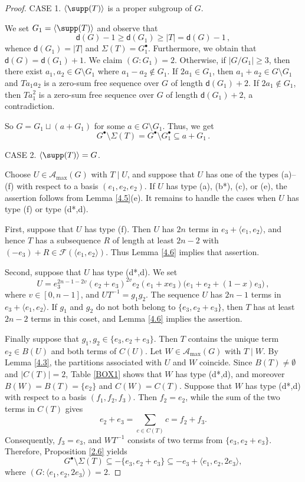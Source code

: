 \documentclass[a4paper, 10pt]{amsart}
\theoremstyle{plain}
\theoremstyle{definition}
\numberwithin{equation}{section}
\begin{document}
{\begin{proof}
\smallskip
\noindent
CASE 1. $\langle \supp (T) \rangle$ is a proper subgroup of $G$.

We set $G_1 = \langle \supp (T) \rangle$ and observe that 
\[
\mathsf d (G) -1 \ge \mathsf d (G_1) \ge |T| = \mathsf d (G) -1 \,,
\]
whence $\mathsf d (G_1) = |T|$ and $\Sigma (T) = G_1^{\bullet}$. Furthermore, we obtain that $\mathsf d (G) = \mathsf d (G_1)+1$. We claim $(G:G_1)=2$.  Otherwise, if $|G/G_1|\ge 3$, then there exist $a_1, a_2\in G\setminus G_1$ where $a_1- a_2\notin G_1$. If $2a_1\in G_1$, then $a_1+ a_2\in G\setminus G_1$ and $Ta_1 a_2$ is a zero-sum free sequence over $G$ of length $\mathsf d (G_1)+2$. If $2a_1\notin G_1$, then $Ta_1 ^2$ is a zero-sum free sequence over $G$ of length $\mathsf d (G_1)+2$, a contradiction. 

So $G = G_1 \sqcup (a+G_1)$ for some $a \in G \setminus G_1$. Thus, we get
\[
G^{\bullet} \setminus \Sigma (T) = G^{\bullet} \setminus G_1^{\bullet} \subseteq a + G_1 \,.
\]



\smallskip
\noindent
CASE 2. $\langle \supp (T) \rangle = G$.



Choose $U\in\mathcal A_{\max}(G)$ with $T\mid U$, and suppose that $U$ has one of the types (a)--(f) with respect to a basis $(e_1,e_2,e_2)$. If $U$ has type (a), (b*), (c), or (e), the assertion follows from Lemma \ref{4.5}(e). It remains to handle the cases when $U$ has type (f) or type (d*,d).

First, suppose that $U$ has type (f). Then $U$ has $2n$ terms in $e_3+\langle e_1,e_2\rangle$, and hence $T$ has a subsequence $R$ of length at least $2n-2$ with $(-e_3)+R\in\mathcal F(\langle e_1,e_2\rangle)$. Thus Lemma \ref{4.6} implies that assertion.

Second, suppose that $U$ has type (d*,d). We set
\[
U=e_3^{2n-1-2v}(e_2+e_3)^{2v}e_2(e_1+xe_3)\big(e_1+e_2+(1-x)e_3\big) \,,
\]
where $v\in[0,n-1]$, and $UT^{-1}=g_1g_2$. The sequence $U$ has $2n-1$ terms in $e_3+\langle e_1,e_2\rangle$. If $g_1$ and $g_2$ do not both belong to $\{e_3,e_2+e_3\}$, then $T$ has at least $2n-2$ terms in this coset, and Lemma \ref{4.6} implies the assertion.

Finally suppose that $g_1,g_2\in\{e_3,e_2+e_3\}$. Then $T$ contains the unique term $e_2\in B(U)$ and both terms of $C(U)$. Let $W\in\mathcal A_{\max}(G)$ with $T\mid W$. By Lemma \ref{4.3}, the partitions associated with $U$ and $W$ coincide. Since $B(T)\ne\emptyset$ and $|C(T)|=2$, Table \ref{BOX1} shows that $W$ has type (d*,d), and moreover $B(W)=B(T)=\{e_2\}$ and $C(W)=C(T)$. Suppose that  $W$ has type (d*,d) with respect to a basis  $(f_1,f_2,f_3)$. Then $f_2=e_2$, while the sum of the two terms in $C(T)$ gives
\[
e_2+e_3=\sum_{c\in C(T)}c=f_2+f_3.
\]
Consequently, $f_3=e_3$, and $WT^{-1}$ consists of two terms from $\{e_3,e_2+e_3\}$. Therefore, Proposition \ref{2.6}  yields
\[
G^{\bullet}\setminus\Sigma(T)\subseteq-\{e_3,e_2+e_3\}
\subseteq-e_3+\langle e_1,e_2,2e_3\rangle,
\]
where $(G:\langle e_1,e_2,2e_3\rangle)=2$. 
\end{proof}


}
\end{document}
